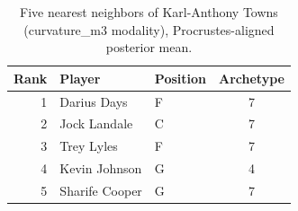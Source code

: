 \begin{table}[htbp]
  \centering\small
  \begin{tabular}{rllc}
    \toprule
    Rank & Player & Position & Archetype \\
    \midrule
    1 & Darius Days & F & 7 \\
    2 & Jock Landale & C & 7 \\
    3 & Trey Lyles & F & 7 \\
    4 & Kevin Johnson & G & 4 \\
    5 & Sharife Cooper & G & 7 \\
    \bottomrule
  \end{tabular}
  \caption{Five nearest neighbors of Karl-Anthony Towns (curvature_m3 modality), Procrustes-aligned posterior mean.}
  \label{tab:Karl_Anthony_Towns_neighbors_curvature_m3}
\end{table}

